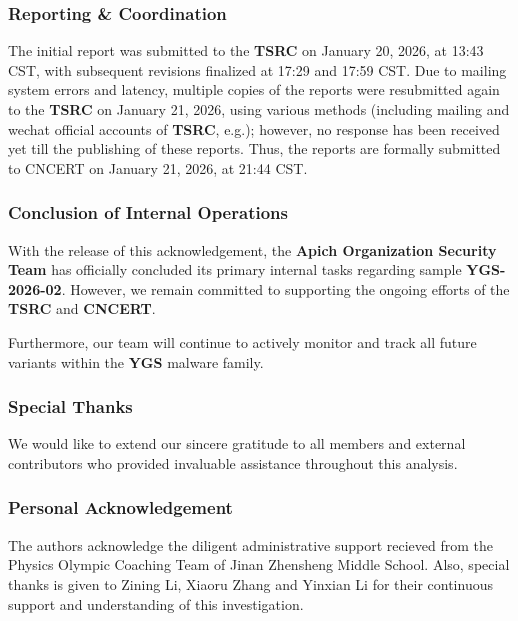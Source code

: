 \documentclass[
]{article}
\begin{document}
\subsubsection{\texorpdfstring{\textbf{Reporting \&
Coordination}}{Reporting \& Coordination}}\label{reporting--coordination-2}

The initial report was submitted to the \textbf{TSRC} on January 20,
2026, at 13:43 CST, with subsequent revisions finalized at 17:29 and
17:59 CST. Due to mailing system errors and latency, multiple copies of
the reports were resubmitted again to the \textbf{TSRC} on January 21,
2026, using various methods (including mailing and wechat official
accounts of \textbf{TSRC}, e.g.); however, no response has been received
yet till the publishing of these reports. Thus, the reports are formally
submitted to CNCERT on January 21, 2026, at 21:44 CST.

\subsubsection{\texorpdfstring{\textbf{Conclusion of Internal
Operations}}{Conclusion of Internal Operations}}\label{conclusion-of-internal-operations-2}

With the release of this acknowledgement, the \textbf{Apich Organization
Security Team} has officially concluded its primary internal tasks
regarding sample \textbf{YGS-2026-02}. However, we remain committed to
supporting the ongoing efforts of the \textbf{TSRC} and \textbf{CNCERT}.

Furthermore, our team will continue to actively monitor and track all
future variants within the \textbf{YGS} malware family.

\subsubsection{\texorpdfstring{\textbf{Special
Thanks}}{Special Thanks}}\label{special-thanks-2}

We would like to extend our sincere gratitude to all members and
external contributors who provided invaluable assistance throughout this
analysis.

\subsubsection{\texorpdfstring{\textbf{Personal
Acknowledgement}}{Personal Acknowledgement}}\label{personal-acknowledgement-2}

The authors acknowledge the diligent administrative support recieved
from the Physics Olympic Coaching Team of Jinan Zhensheng Middle School.
Also, special thanks is given to Zining Li, Xiaoru Zhang and Yinxian Li
for their continuous support and understanding of this investigation.
\end{document}
